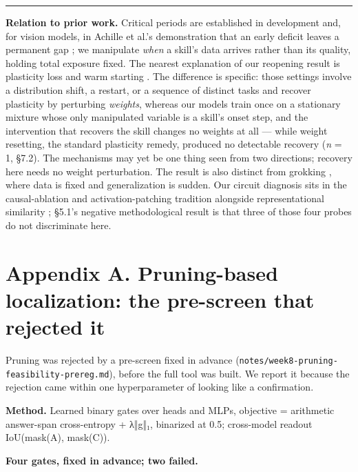 \documentclass[11pt]{article}
\begin{document}
\begin{center}\rule{0.5\linewidth}{0.5pt}\end{center}

\textbf{Relation to prior work.} Critical periods are established in
development and, for vision models, in Achille et al.'s demonstration that an early deficit
leaves a permanent gap \citep{achille-etal-2019}; we manipulate \emph{when} a skill's data arrives
rather than its quality, holding total exposure fixed. The nearest explanation of our
reopening result is plasticity loss and warm starting
\citep{ash-adams-2020,dohare-etal-2024,lyle-etal-2023}. The difference is specific: those
settings involve a distribution shift, a restart, or a sequence of distinct tasks and
recover plasticity by perturbing \emph{weights}, whereas our models train once on a stationary
mixture whose only manipulated variable is a skill's onset step, and the intervention that
recovers the skill changes no weights at all — while weight resetting, the standard
plasticity remedy, produced no detectable recovery (\emph{n} = 1, §7.2). The mechanisms may yet be
one thing seen from two directions; recovery here needs no weight perturbation. The result
is also distinct from grokking \citep{power-etal-2022}, where data is fixed and
generalization is sudden. Our circuit diagnosis sits in the causal-ablation and
activation-patching tradition \citep{elhage-etal-2021,wang-etal-2023,meng-etal-2022} alongside
representational similarity \citep{kornblith-etal-2019}; §5.1's negative methodological
result is that three of those four probes do not discriminate here.



\appendix
\section{Appendix A. Pruning-based localization: the pre-screen that rejected it}\label{appendix-a.-pruning-based-localization-the-pre-screen-that-rejected-it}

Pruning was rejected by a pre-screen fixed in advance
(\texttt{notes/week8-pruning-feasibility-prereg.md}), before the full tool was built. We report it
because the rejection came within one hyperparameter of looking like a confirmation.

\textbf{Method.} Learned binary gates over heads and MLPs, objective = arithmetic answer-span
cross-entropy + λ‖g‖₁, binarized at 0.5; cross-model readout IoU(mask(A), mask(C)).

\textbf{Four gates, fixed in advance; two failed.}
\end{document}
